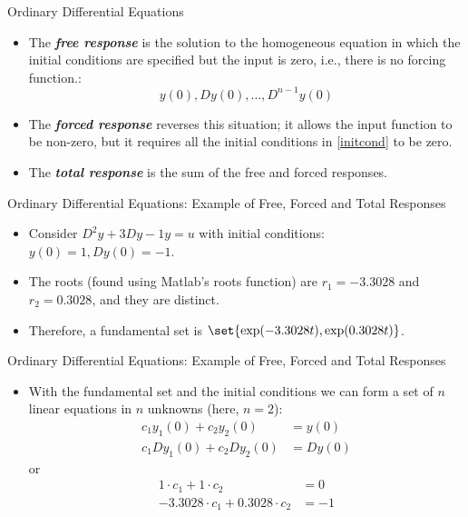 \begin{frame}
Ordinary Differential Equations
 \begin{itemize}
 \item The \textit{\textbf{free response}} is the solution to the homogeneous
 equation in which the initial conditions are specified but the input is zero, i.e., there is no forcing function.:
\begin{equation}\label{initcond}
  y(0),Dy(0),\ldots,D^{n-1}y(0)
\end{equation}
 \item The \textit{\textbf{forced response}} reverses this situation; it allows the
 input function to be non-zero, but it requires all the initial
 conditions in \eqref{initcond} to be zero.
 \item The \textit{\textbf{total response}} is the sum of the free and forced
 responses.
\end{itemize}
\end{frame}
\begin{frame}
Ordinary Differential Equations: Example of Free, Forced and Total
Responses
 \begin{itemize}
 \item Consider $D^2y+3Dy-1y=u$ with initial conditions:
 $y(0)=1,Dy(0)=-1$.
 \item The roots (found using Matlab's roots function) are $r_1=-3.3028$ and $r_2=0.3028$, and they are
 distinct.
 \item Therefore, a fundamental set is
 $\set{\exp(-3.3028t),\exp(0.3028t)}$.
\end{itemize}
\end{frame}
\begin{frame}
Ordinary Differential Equations: Example of Free, Forced and Total
Responses
 \begin{itemize}
 \item With the fundamental set and the initial conditions we can
 form a set of $n$ linear equations in $n$ unknowns (here, $n=2$):
\begin{align*}
  c_1y_1(0)+c_2y_2(0) & =y(0) \\
  c_1Dy_1(0)+c_2Dy_2(0) & =Dy(0)
\end{align*}
or
\begin{align*}
  1\cdot c_1+1\cdot c_2 & =0 \\
  -3.3028\cdot c_1+0.3028\cdot c_2 & =-1
\end{align*}
\end{itemize}
\end{frame}
